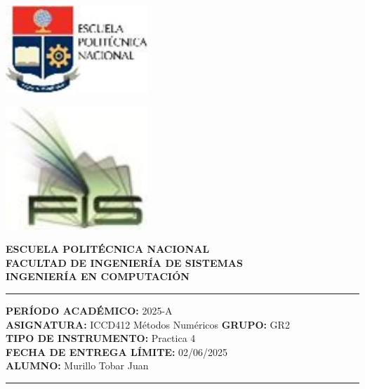 \documentclass[12pt]{article}
\begin{document}
\begin{minipage}{0.45\textwidth}
    \includegraphics[width=0.4\textwidth]{inFiles/Figures/epnLogo.jpg}
\end{minipage}
\hfill
\begin{minipage}{0.45\textwidth}
    \raggedleft
    \includegraphics[width=0.4\textwidth]{inFiles/Figures/FIS_logo.jpg}
\end{minipage}


\vspace{0.5cm}

\begin{center}
    \textbf{ESCUELA POLITÉCNICA NACIONAL}\\[0.2cm]
    \textbf{FACULTAD DE INGENIERÍA DE SISTEMAS}\\[0.2cm]
    \textbf{INGENIERÍA {\textbf{EN COMPUTACIÓN}}}
\end{center}

\vspace{0.5cm}
\hrule
\vspace{0.5cm}

\noindent\textbf{PERÍODO ACADÉMICO:} 2025-A\\[0.2cm]
\noindent\textbf{ASIGNATURA:} ICCD412 Métodos Numéricos \hfill \textbf{GRUPO:} GR2\\[0.2cm]
\noindent\textbf{TIPO DE INSTRUMENTO:} Practica 4\\[0.2cm]
\noindent\textbf{FECHA DE ENTREGA LÍMITE:} 02/06/2025\\[0.2cm]
\noindent\textbf{ALUMNO:} Murillo Tobar Juan

\vspace{0.5cm}
\hrule
\vspace{1cm}
\end{document}
